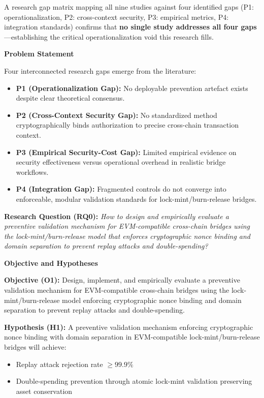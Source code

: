 \documentclass[
]{article}
\begin{document}
A research gap matrix mapping all nine studies against four identified gaps (P1: operationalization, P2: cross-context security, P3: empirical metrics, P4: integration standards) confirms that \textbf{no single study addresses all four gaps}---establishing the critical operationalization void this research fills.

\textbf{Problem Statement}

Four interconnected research gaps emerge from the literature:

\begin{itemize}
  \item \textbf{P1 (Operationalization Gap):} No deployable prevention artefact exists despite clear theoretical consensus.
  \item \textbf{P2 (Cross-Context Security Gap):} No standardized method cryptographically binds authorization to precise cross-chain transaction context.
  \item \textbf{P3 (Empirical Security-Cost Gap):} Limited empirical evidence on security effectiveness versus operational overhead in realistic bridge workflows.
  \item \textbf{P4 (Integration Gap):} Fragmented controls do not converge into enforceable, modular validation standards for lock-mint/burn-release bridges.
\end{itemize}

\textbf{Research Question (RQ0):} \textit{How to design and empirically evaluate a preventive validation mechanism for EVM-compatible cross-chain bridges using the lock-mint/burn-release model that enforces cryptographic nonce binding and domain separation to prevent replay attacks and double-spending?}

\textbf{Objective and Hypotheses}

\textbf{Objective (O1):} Design, implement, and empirically evaluate a preventive validation mechanism for EVM-compatible cross-chain bridges using the lock-mint/burn-release model enforcing cryptographic nonce binding and domain separation to prevent replay attacks and double-spending.

\textbf{Hypothesis (H1):} A preventive validation mechanism enforcing cryptographic nonce binding with domain separation in EVM-compatible lock-mint/burn-release bridges will achieve:
\begin{itemize}
  \item[\textbf{H1a}] Replay attack rejection rate $\geq 99.9\%$
  \item[\textbf{H1b}] Double-spending prevention through atomic lock-mint validation preserving asset conservation
\end{itemize}
\end{document}
